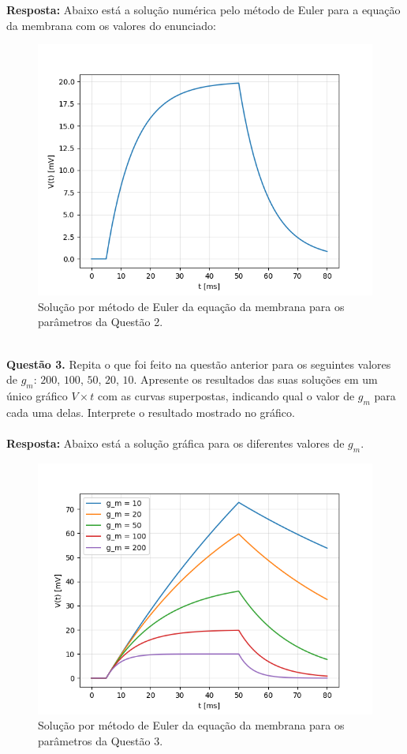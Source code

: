 \documentclass[portuguese,12pt,a4paper]{article}
\begin{document}
	\noindent\textbf{Resposta:} Abaixo está a solução numérica pelo método de Euler para a equação da membrana com os valores do enunciado:
	
	
	
	\begin{figure}[H]
		\centering
		\includegraphics[width=12cm]{../ex_2.png}
		\caption{Solução por método de Euler da equação da membrana para os parâmetros da Questão 2.\\\\}
	\end{figure}
	
	
	\noindent\textbf{Questão 3.} Repita o que foi feito na questão anterior para os seguintes valores de $g_m$: $200$, $100$, $50$, $20$, $10$. Apresente os resultados das suas soluções em um único gráfico $V \times t$ com as curvas superpostas, indicando qual o valor de $g_m$ para cada uma delas. Interprete o resultado mostrado no gráfico.\\\\
	
	\noindent\textbf{Resposta:} Abaixo está a solução gráfica para os diferentes valores de $g_m$.
	
	\begin{figure}[H]
		\centering
		\includegraphics[width=12cm]{../ex_3.png}
		\caption{Solução por método de Euler da equação da membrana para os parâmetros da Questão 3.}
	\end{figure}
	
\end{document}
